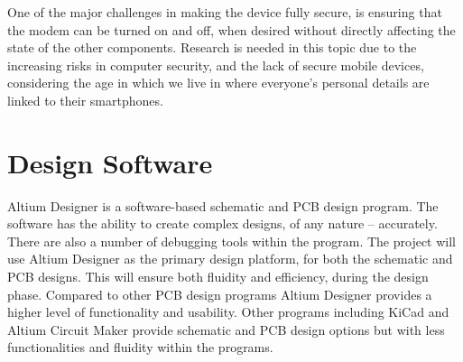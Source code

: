 One of the major challenges in making the device fully secure, is ensuring that the modem can be turned on and off, when desired without directly affecting the state of the other components. 
	Research is needed in this topic due to the increasing risks in computer security, and the lack of secure mobile devices, considering the age in which we live in where everyone’s personal details are linked to their smartphones.


\section{Design Software}
\label{chap2sec8}

Altium Designer is a software-based schematic and PCB design program.
The software has the ability to create complex designs, of any nature – accurately.
There are also a number of debugging tools within the program. 
The project will use Altium Designer as the primary design platform, for both the schematic and PCB designs.
This will ensure both fluidity and efficiency, during the design phase. 
Compared to other PCB design programs Altium Designer provides a higher level of functionality and usability.
Other programs including KiCad and Altium Circuit Maker provide schematic and PCB design options but with less functionalities and fluidity within the programs. 
